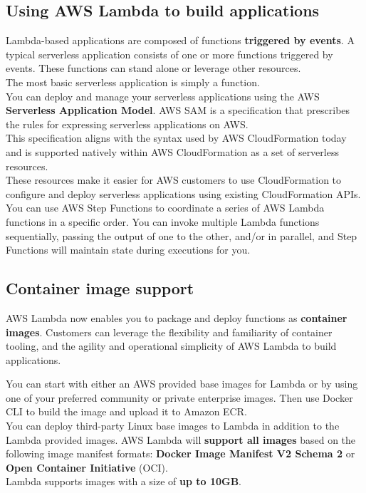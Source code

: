 \documentclass[12pt, letterpaper, twoside]{article}
\begin{document}
\subsection{Using AWS Lambda to build applications}
Lambda-based applications are composed of functions \textbf{triggered by events}. A typical serverless application consists of 
one or more functions triggered by events. These functions can stand alone or leverage other resources.\\
The most basic serverless application is simply a function.\\

You can deploy and manage your serverless applications using the AWS \textbf{Serverless Application Model}. AWS SAM is a specification 
that prescribes the rules for expressing serverless applications on AWS.\\
This specification aligns with the syntax used by AWS CloudFormation today and is supported natively within AWS CloudFormation as a 
set of serverless resources.\\
These resources make it easier for AWS customers to use CloudFormation to configure and deploy serverless applications using existing 
CloudFormation APIs.\\

You can use AWS Step Functions to coordinate a series of AWS Lambda functions in a specific order. You can invoke multiple Lambda 
functions sequentially, passing the output of one to the other, and/or in parallel, and Step Functions will maintain state during 
executions for you.\\

\subsection{Container image support}
AWS Lambda now enables you to package and deploy functions as \textbf{container images}. Customers can leverage the flexibility and familiarity 
of container tooling, and the agility and operational simplicity of AWS Lambda to build applications.

You can start with either an AWS provided base images for Lambda or by using one of your preferred community or private enterprise 
images. Then use Docker CLI to build the image and upload it to Amazon ECR.\\

You can deploy third-party Linux base images to Lambda in addition to the Lambda provided images. AWS Lambda will \textbf{support all 
images} based on the following image manifest formats: \textbf{Docker Image Manifest V2 Schema 2} or \textbf{Open Container Initiative} (OCI).\\
Lambda supports images with a size of \textbf{up to 10GB}.\\
\end{document}
